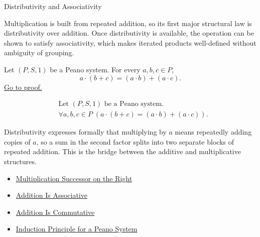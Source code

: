 \begin{topicbox}{Distributivity and Associativity}
\begin{exposition}
Multiplication is built from repeated addition, so its first major structural
law is distributivity over addition. Once distributivity is available, the
operation can be shown to satisfy associativity, which makes iterated products
well-defined without ambiguity of grouping.
\end{exposition}

\begin{tcolorbox}[colback=thmbox, colframe=thmborder, arc=2pt,
  left=6pt, right=6pt, top=4pt, bottom=4pt,
  title={\small\textbf{Theorem (Multiplication Distributes Over Addition)}},
  fonttitle=\small\bfseries]
\begin{theorem}
\label{thm:multiplication-distributes-over-addition}
Let $(P,S,1)$ be a Peano system. For every $a,b,c \in P$,
\[
a \cdot (b+c) = (a \cdot b) + (a \cdot c).
\]
\hyperref[prf:multiplication-distributes-over-addition]{Go to proof.}
\end{theorem}
\end{tcolorbox}

\begin{remark*}
\[
\begin{aligned}
&\text{Let } (P,S,1) \text{ be a Peano system.}\\
&\forall a,b,c \in P\;(a \cdot (b+c) = (a \cdot b) + (a \cdot c)).
\end{aligned}
\]
\end{remark*}

\begin{remark*}[Interpretation]
Distributivity expresses formally that multiplying by $a$ means repeatedly
adding copies of $a$, so a sum in the second factor splits into two separate
blocks of repeated addition. This is the bridge between the additive and
multiplicative structures.
\end{remark*}

\begin{dependencies}
\begin{itemize}
  \item \hyperref[thm:multiplication-successor-on-right]{Multiplication Successor on the Right}
  \item \hyperref[thm:addition-associative]{Addition Is Associative}
  \item \hyperref[thm:addition-commutative]{Addition Is Commutative}
  \item \hyperref[thm:induction-principle-for-peano-system]{Induction Principle for a Peano System}
\end{itemize}
\end{dependencies}


\end{topicbox}
